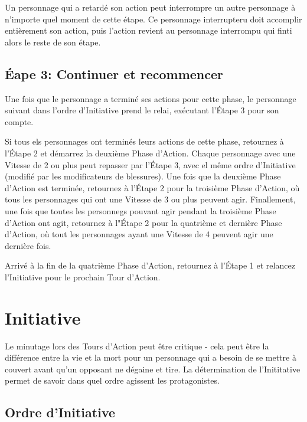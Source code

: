 Un personnage qui a retardé son action peut interrompre un autre personnage à n'importe quel moment de cette étape. Ce personnage interrupteru doit accomplir entièrement son action, puis l'action revient au personnage interrompu qui finti alors le reste de son étape. 



\subsection{Éape 3: Continuer et recommencer} \label{sec:rotate-repeat} 

Une fois que le personnage a terminé ses actions pour cette phase, le personnage suivant dans l'ordre d'Initiative prend le relai, exécutant l'Étape 3 pour son compte. 

Si tous els personnages ont terminés leurs actions de cette phase, retournez à l'Étape 2 et démarrez la deuxième Phase d'Action. Chaque personnage avec une Vitesse de 2 ou plus peut repasser par l'Étape 3, avec el même ordre d'Initiative (modifié par les modificateurs de blessures). Une fois que la deuxième Phase d'Action est terminée, retournez à l'Étape 2 pour la troisième Phase d'Action, où tous les personnages qui ont une Vitesse de 3 ou plus peuvent agir. Finallement, une fois que toutes les personnegs pouvant agir pendant la troisième Phase d'Action ont agit, retournez à l"Étape 2 pour la quatrième et dernière Phase d'Action, où tout les personnages ayant une Vitesse de 4 peuvent agir une dernière fois. 

Arrivé à la fin de la quatrième Phase d'Action, retournez à l'Étape 1 et relancez l'Initiative pour le prochain Tour d'Action. 



\section{Initiative} \label{sec:initiative} 

Le minutage lors des Tours d'Action peut être critique - cela peut être la différence entre la vie et la mort pour un personnage qui a besoin de se mettre à couvert avant qu'un opposant ne dégaine et tire. La détermination de l'Inititative permet de savoir dans quel ordre agissent les protagonistes. 



\subsection{Ordre d'Initiative} \label{sec:initiative-order} 

